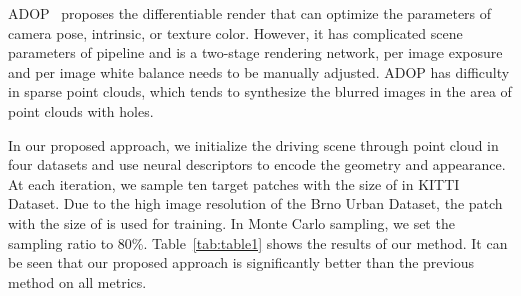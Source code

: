 \documentclass[sigconf]{acmart}
\begin{document}
ADOP~\cite{ruckert2021adop} proposes the differentiable render that can optimize the parameters of camera pose, intrinsic, or texture color. However, it has complicated scene parameters of pipeline and is a two-stage rendering network, per image exposure and per image white balance needs to be manually adjusted. ADOP has difficulty in sparse point clouds, which tends to synthesize the blurred images in the area of point clouds with holes.

In our proposed approach, we initialize the driving scene through point cloud in four datasets and use neural descriptors to encode the geometry and appearance. At each iteration, we sample ten target patches with the size of  in KITTI Dataset. Due to the high image resolution of the Brno Urban Dataset, the patch with the size of  is used for training. In Monte Carlo sampling, we set the sampling ratio to 80\%. Table~\ref{tab:table1} shows the results of our method. It can be seen that our proposed approach is significantly better than the previous method on all metrics.
\end{document}
